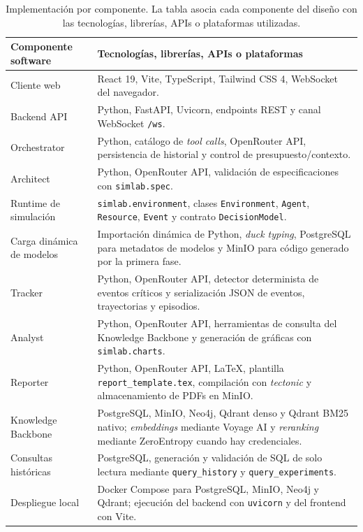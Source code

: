 \begin{table}[H]
\begin{center}
\small
\setlength{\tabcolsep}{6pt}
\renewcommand{\arraystretch}{1.18}
\begin{tabular}{|>{\raggedright\arraybackslash}p{3.2cm}|>{\raggedright\arraybackslash}p{8.7cm}|} \hline
\textbf{Componente software} & \textbf{Tecnologías, librerías, APIs o plataformas} \\ \hline
Cliente web & React 19, Vite, TypeScript, Tailwind CSS 4, WebSocket del navegador. \\ \hline
Backend API & Python, FastAPI, Uvicorn, endpoints REST y canal WebSocket \texttt{/ws}. \\ \hline
Orchestrator & Python, catálogo de \textit{tool calls}, OpenRouter API, persistencia de historial y control de presupuesto/contexto. \\ \hline
Architect & Python, OpenRouter API, validación de especificaciones con \texttt{simlab.spec}. \\ \hline
Runtime de simulación & \texttt{simlab.environment}, clases \texttt{Environment}, \texttt{Agent}, \texttt{Resource}, \texttt{Event} y contrato \texttt{DecisionModel}. \\ \hline
Carga dinámica de modelos & Importación dinámica de Python, \textit{duck typing}, PostgreSQL para metadatos de modelos y MinIO para código generado por la primera fase. \\ \hline
Tracker & Python, OpenRouter API, detector determinista de eventos críticos y serialización JSON de eventos, trayectorias y episodios. \\ \hline
Analyst & Python, OpenRouter API, herramientas de consulta del Knowledge Backbone y generación de gráficas con \texttt{simlab.charts}. \\ \hline
Reporter & Python, OpenRouter API, LaTeX, plantilla \texttt{report\_template.tex}, compilación con \textit{tectonic} y almacenamiento de PDFs en MinIO. \\ \hline
Knowledge Backbone & PostgreSQL, MinIO, Neo4j, Qdrant denso y Qdrant BM25 nativo; \textit{embeddings} mediante Voyage AI y \textit{reranking} mediante ZeroEntropy cuando hay credenciales. \\ \hline
Consultas históricas & PostgreSQL, generación y validación de SQL de solo lectura mediante \texttt{query\_history} y \texttt{query\_experiments}. \\ \hline
Despliegue local & Docker Compose para PostgreSQL, MinIO, Neo4j y Qdrant; ejecución del backend con \texttt{uvicorn} y del frontend con Vite. \\ \hline
\end{tabular}
\caption[Implementación por componente]{Implementación por componente. La
tabla asocia cada componente del diseño con las tecnologías, librerías, APIs o
plataformas utilizadas.}
\label{tab:implementacion-componentes}
\end{center}
\end{table}

